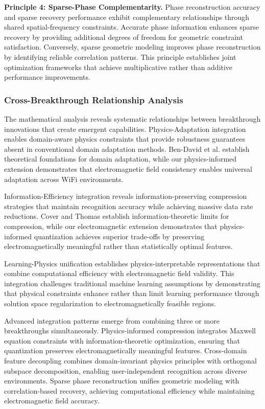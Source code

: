 \documentclass[journal]{IEEEtran}
\begin{document}
\textbf{Principle 4: Sparse-Phase Complementarity.} Phase reconstruction accuracy and sparse recovery performance exhibit complementary relationships through shared spatial-frequency constraints. Accurate phase information enhances sparse recovery by providing additional degrees of freedom for geometric constraint satisfaction. Conversely, sparse geometric modeling improves phase reconstruction by identifying reliable correlation patterns. This principle establishes joint optimization frameworks that achieve multiplicative rather than additive performance improvements.

\subsubsection{Cross-Breakthrough Relationship Analysis}

The mathematical analysis reveals systematic relationships between breakthrough innovations that create emergent capabilities. Physics-Adaptation integration enables domain-aware physics constraints that provide robustness guarantees absent in conventional domain adaptation methods. Ben-David et al. \cite{ben2010theory} establish theoretical foundations for domain adaptation, while our physics-informed extension demonstrates that electromagnetic field consistency enables universal adaptation across WiFi environments.

Information-Efficiency integration reveals information-preserving compression strategies that maintain recognition accuracy while achieving massive data rate reductions. Cover and Thomas \cite{cover1999elements} establish information-theoretic limits for compression, while our electromagnetic extension demonstrates that physics-informed quantization achieves superior trade-offs by preserving electromagnetically meaningful rather than statistically optimal features.

Learning-Physics unification establishes physics-interpretable representations that combine computational efficiency with electromagnetic field validity. This integration challenges traditional machine learning assumptions by demonstrating that physical constraints enhance rather than limit learning performance through solution space regularization to electromagnetically feasible regions.

Advanced integration patterns emerge from combining three or more breakthroughs simultaneously. Physics-informed compression integrates Maxwell equation constraints with information-theoretic optimization, ensuring that quantization preserves electromagnetically meaningful features. Cross-domain feature decoupling combines domain-invariant physics principles with orthogonal subspace decomposition, enabling user-independent recognition across diverse environments. Sparse phase reconstruction unifies geometric modeling with correlation-based recovery, achieving computational efficiency while maintaining electromagnetic field accuracy.
\end{document}
